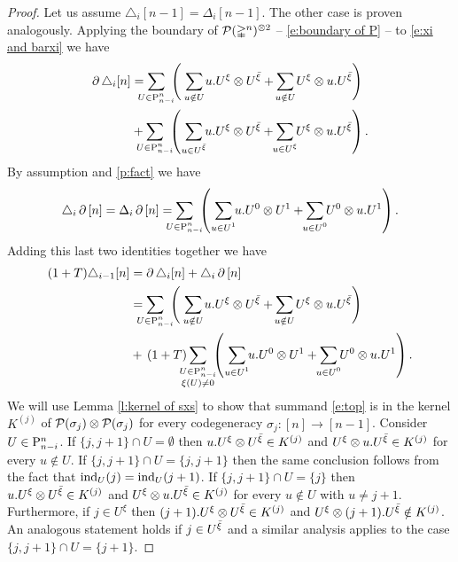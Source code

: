\begin{proof}
	Let us assume $\triangle_i [n-1] = \Delta_i [n-1]$.
	The other case is proven analogously.
	Applying the boundary of $\cP(\simplex^n)^{\ot 2}$ -- \cref{e:boundary of P} -- to \cref{e:xi and barxi}	we have
	\begin{align*}
	\bd \triangle_i [n] & =
	\sum_{\mathclap{U \in \P_{n-i}^n}} \
	\left(\
	\sum_{\mathclap{u \notin U}} u.U^\xi \ot U^\barxi +
	\sum_{\mathclap{u \notin U}} U^\xi \ot u.U^\barxi
	\right) \\ & +
	\sum_{\mathclap{U \in \P_{n-i}^n}} \
	\left(\
	\sum_{\mathclap{u \in U^\barxi}} u.U^\xi \ot U^\barxi +
	\sum_{\mathclap{u \in U^{\xi}}} U^\xi \ot u.U^\barxi
	\right).
	\end{align*}
	By assumption and \cref{p:fact} we have
	\[
	\triangle_i \bd \, [n] =
	\Delta_i \bd \, [n] =
	\sum_{\mathclap{U \in \P_{n-i}^n}} \
	\left(\
	\sum_{\mathclap{u \in U^1}} u.U^0 \ot U^1 +
	\sum_{\mathclap{u \in U^0}} U^0 \ot u.U^1
	\right).
	\]
	Adding this last two identities together we have
	\begin{align}
	(1+T) \triangle_{i-1} [n] &=
	\bd \triangle_i [n] + \triangle_i \bd \, [n] \\ &=
	\label{e:top} \sum_{\mathclap{U \in \P_{n-i}^n}} \
	\left(\
	\sum_{\mathclap{u \notin U}} u.U^\xi \ot U^\barxi +
	\sum_{\mathclap{u \notin U}} U^\xi \ot u.U^\barxi
	\right) \\ &+ \,
	\label{e:bottom} (1+T) \sum_{\mathclap{\substack{U \in \P_{n-i}^n \\ \xi(U) \neq 0}}} \
	\left(\
	\sum_{\mathclap{u \in U^1}} u.U^0 \ot U^1 +
	\sum_{\mathclap{u \in U^0}} U^0 \ot u.U^1
	\right).
	\end{align}
	We will use Lemma \ref{l:kernel of sxs} to show that summand \eqref{e:top} is in the kernel $K^{(j)}$ of $\cP(\sigma_j) \ot \cP(\sigma_j)$ for every codegeneracy $\sigma_j \colon [n] \to [n-1]$.
	Consider $U \in \P_{n-i}^n$.
	If $\{j, j+1\} \cap U = \emptyset$ then $u.U^\xi \ot U^\barxi \in K^{(j)}$ and $U^\xi \ot u.U^\barxi \in K^{(j)}$ for every $u \notin U$.
	If $\{j, j+1\} \cap U = \{j, j+1\}$ then the same conclusion follows from the fact that $\ind_U(j) = \ind_U(j+1)$.
	If $\{j, j+1\} \cap U = \{j\}$ then $u.U^\xi \ot U^\barxi \in K^{(j)}$ and $U^\xi \ot u.U^\barxi \in K^{(j)}$ for every $u \notin U$ with $u \neq j+1$.
	Furthermore, if $j \in U^\xi$ then $(j+1).U^\xi \ot U^\barxi \in K^{(j)}$ and $U^\xi \ot (j+1).U^\barxi \notin K^{(j)}$.
	An analogous statement holds if $j \in U^\barxi$ and a similar analysis applies to the case $\{j, j+1\} \cap U = \{j+1\}$.

\end{proof}
